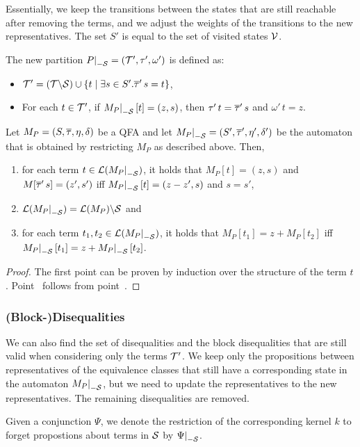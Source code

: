Essentially, we keep the transitions between the states that are still reachable after removing the terms, and we adjust the weights of the transitions to the new representatives.
The set $S'$ is equal to the set of visited states $\mathcal{V}$.

The new partition $\restr{P}{-\Set} = (\T', \tau', \omega')$ is defined as:
\begin{itemize}
    \item $\mathcal{T}' = (\mathcal{T} \backslash \mathcal{S}) \cup \{t \mid \exists s \in S' . \overline{\tau}'\,s = t\}$,
    \item For each $t \in \mathcal{T}'$, if $\restr{M_P}{-\Set}[t] = (z, s)$, then $\tau'\,t = \overline{\tau}'\,s$ and $\omega'\,t = z$.
\end{itemize}

\begin{theorem}\label{restriction}
    Let $M_P = (S, \overline{\tau}, \eta, \delta)$ be a QFA and let $\restr{M_P}{-\Set} = (S', \otau', \eta', \delta')$ be the automaton that is obtained by restricting $M_P$ as described above.
    Then,
    \begin{enumerate}
    \item\label{item:lemma-restriction} for each term $t \in \L(\restr{M_P}{-\Set})$, it holds that $M_P[t] = (z, s)$ and $M[\overline{\tau}'\,s] = (z', s')$ iff $\restr{M_P}{-\Set}[t] = (z - z', s)$ and $s = s'$,
    \item $\L(\restr{M_P}{-\Set}) = \L(M_P) \backslash \Set$ and
    \item\label{item:correctness-restriction} for each term $t_1, t_2 \in \L(\restr{M_P}{-\Set})$, it holds that $M_P[t_1] = z + M_P[t_2]$ iff $\restr{M_P}{-\Set}[t_1] = z + \restr{M_P}{-\Set}[t_2]$.
    \end{enumerate}
\end{theorem}
\begin{proof}
    The first point can be proven by induction over the structure of the term $t$.
    Point~ follows from point~.
\end{proof}
\subsubsection{(Block-)Disequalities}
We can also find the set of disequalities and the block disequalities that are still valid when considering only the terms $\mathcal{T}'$.
We keep only the propositions between representatives of the equivalence classes that
still have a corresponding state in the automaton $\restr{M_P}{-\Set}$, but we need to update the representatives to the new representatives.
The remaining disequalities are removed.

Given a conjunction $\Psi$, we denote the restriction of the corresponding kernel $k$ to forget propostions about terms in $\mathcal{S}$ by $\restr{\Psi}{-\Set}$.
